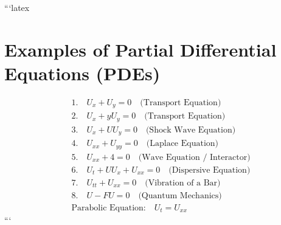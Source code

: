 ```latex
\section*{Examples of Partial Differential Equations (PDEs)}

\begin{align}
    &1. \quad U_x + U_y = 0 \quad \text{(Transport Equation)} \\
    &2. \quad U_x + y U_y = 0 \quad \text{(Transport Equation)} \\
    &3. \quad U_x + U U_y = 0 \quad \text{(Shock Wave Equation)} \\
    &4. \quad U_{xx} + U_{yy} = 0 \quad \text{(Laplace Equation)} \\
    &5. \quad U_{xx} + 4 = 0 \quad \text{(Wave Equation / Interactor)} \\
    &6. \quad U_t + U U_x + U_{xx} = 0 \quad \text{(Dispersive Equation)} \\
    &7. \quad U_{tt} + U_{xx} = 0 \quad \text{(Vibration of a Bar)} \\
    &8. \quad U - F U = 0 \quad \text{(Quantum Mechanics)} \\
    &\text{Parabolic Equation:} \quad U_t = U_{xx}
\end{align}
```
